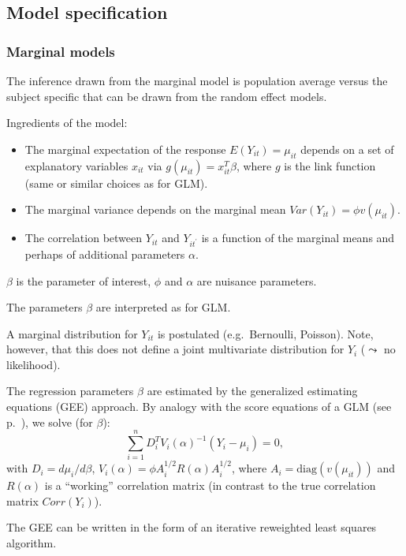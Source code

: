 \documentclass{beamer}
\newcommand{\bs}{\bigskip}
\begin{document}
\subsection{Model specification}
\begin{frame}[allowframebreaks]
\frametitle{Marginal models}
The inference drawn from the marginal model is {\color{blue}population average} versus the {\color{blue}subject specific} that can be drawn from the random effect models.

\bs
Ingredients of the model:
\begin{itemize}
\item The marginal expectation of the response $E(Y_{it}) = \mu_{it}$
  depends on a set of explanatory variables $x_{it}$ via $g(\mu_{it})
  = x_{it}^T \beta$, where $g$ is the link function (same or similar choices as for GLM).
\item The marginal variance depends on the marginal mean $Var(Y_{it})
  = \phi v(\mu_{it}) $.
\item The correlation between $Y_{it}$ and $Y_{it^\prime}$ is a function of
  the marginal means and perhaps of additional parameters $\alpha$.
\end{itemize}

\bs
$\beta$ is the parameter of interest, $\phi$ and $\alpha$ are nuisance parameters.

\bs
The parameters $\beta$ are interpreted as for GLM.

\bs
A marginal distribution for $Y_{it}$ is postulated (e.g.\ Bernoulli, Poisson). Note,
however, that this does not define a joint multivariate distribution for $Y_i$
($\leadsto$ no likelihood).

\bs\bs\bs\bs\bs\bs\bs
The regression parameters $\beta$ are estimated by the
{\color{blue}generalized estimating equations (GEE)} approach. 
By analogy with the score equations of a GLM (see
p.~\pageref{EE.GLM}), we solve (for $\beta$):
$$\sum_{i=1}^n D_i^T V_i(\alpha)^{-1} (Y_i - \mu_i) =0,$$
with $D_i = d \mu_i/ d \beta$, $V_i(\alpha) = \phi  A_i^{1/2} R(\alpha)
A_i^{1/2}$, where $A_i = \mbox{diag}(v(\mu_{it}))$ and
$R(\alpha)$ is a {\color{blue}``working'' correlation} matrix (in
contrast to the true correlation matrix $Corr(Y_i)$).

\bs
The GEE can be written in the form of an iterative reweighted least squares algorithm.
\end{frame}
\end{document}

